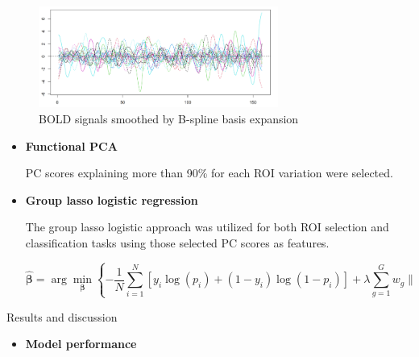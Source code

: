 \documentclass[final]{beamer}
\newlength{\colwidth}
\begin{document}
\begin{frame}[t]
\begin{columns}[t]
\begin{column}{\colwidth}
            \begin{figure}[ht]
    \centering
    \includegraphics[width=0.7\textwidth]{images/After_expansion.png}
    \caption{BOLD signals smoothed by B-spline basis expansion}
    \label{fig:example}
\end{figure}


\begin{itemize}
    \item \textbf{Functional PCA}

    PC scores explaining more than 90\% for each ROI variation were selected.
\end{itemize}
        
        
     

\begin{itemize}
            \item  \textbf{Group lasso logistic regression} 
            
            The group lasso logistic approach was utilized for both ROI selection and classification tasks using those selected PC scores as features.

            \begin{equation*}
  \hat{\boldsymbol{\beta}} = \arg\min_{\boldsymbol{\beta}} \left\{-\frac{1}{N}\sum_{i=1}^{N} \left[y_i \log(p_i) + (1 - y_i) \log(1 - p_i)\right] + \lambda \sum_{g=1}^{G} w_g \|\boldsymbol{\beta}_g\|_2\right\}
\end{equation*}    
\end{itemize}


 









\begin{block}{Results and discussion}

\begin{itemize}
    \item \textbf{Model performance}
    

\end{itemize}
\end{block}
\end{column}
\end{columns}
\end{frame}
\end{document}

